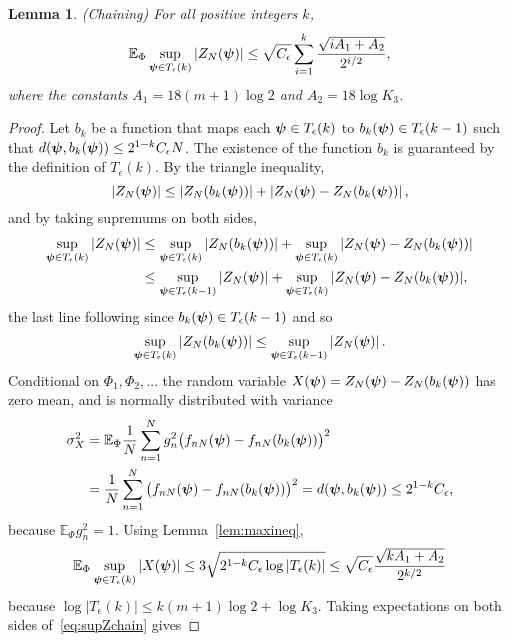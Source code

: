 \documentclass[aap,preprint]{imsart}
\newcommand{\expect}{{\mathbb E}}
\newcommand{\abs}[1]{\left\vert #1 \right\vert}
\newcommand{\sabs}[1]{\vert #1 \vert}
\newtheorem{lemma}{Lemma}
\begin{document}
\begin{lemma}\label{lem:chaining3}(Chaining)
For all positive integers $k$,
\[
\expect_{\Phi} \sup_{\psibf \in T_\epsilon(k) } \abs{ Z_N(\psibf) } \leq \sqrt{C_\epsilon} \sum_{i=1}^{k}\frac{\sqrt{ i A_1 + A_2 }}{2^{i/2}},
\]
where the constants $A_1 = 18(m+1)\log 2$ and $A_2 = 18\log K_3$.
\end{lemma}
\begin{proof}
Let $b_k$ be a function that maps each $\boldsymbol{\psi} \in T_\epsilon(k)$ to $b_k(\boldsymbol{\psi}) \in T_\epsilon(k-1)$ such that  $d(\boldsymbol{\psi},b_k(\boldsymbol{\psi})) \leq 2^{1-k} C_\epsilon N$.  The existence of the function $b_k$ is guaranteed by the definition of $T_\epsilon(k)$.  By the triangle inequality,
\[
\abs{ Z_N(\psibf) } \leq \abs{ Z_N(b_k(\psibf)) } + \abs{ Z_N(\psibf) - Z_N(b_k(\psibf))  },
\]
and by taking supremums on both sides,
\begin{align}
\sup_{\psibf \in T_\epsilon(k) } \sabs{ Z_N(\psibf) } &\leq \sup_{\psibf \in T_\epsilon(k) } \sabs{ Z_N(b_k(\psibf)) } + \sup_{\psibf \in T_\epsilon(k) } \sabs{ Z_N(\psibf) - Z_N(b_k(\psibf))  } \nonumber \\
&\leq \sup_{\psibf \in T_\epsilon(k-1)} \sabs{ Z_N(\psibf) } + \sup_{\psibf \in T_\epsilon(k)} \sabs{ Z_N(\psibf) - Z_N(b_k(\psibf)) }, \label{eq:supZchain}
\end{align}
the last line following since $b_k(\boldsymbol{\psi}) \in T_\epsilon(k-1)$ and so 
\[
\sup_{\psibf \in T_\epsilon(k)} \abs{ Z_N(b_k(\psibf)) } \leq \sup_{\psibf \in T_\epsilon(k-1)} \abs{ Z_N(\psibf) }.
\]
Conditional on $\Phi_1, \Phi_2, \dots$ the random variable $X(\boldsymbol{\psi}) = Z_N(\boldsymbol{\psi}) - Z_N(b_k(\boldsymbol{\psi}))$ has zero mean, and is normally distributed with variance
\begin{align*}
\sigma_X^2 &= \expect_{\Phi} \frac{1}{N} \sum_{n=1}^N g_n^2 \big( f_{nN}(\psibf) - f_{nN}(b_k(\psibf)) \big)^2 \\
&= \frac{1}{N} \sum_{n=1}^N \big( f_{nN}(\psibf) - f_{nN}(b_k(\psibf)) \big)^2 = d(\psibf, b_k(\psibf)) \leq 2^{1-k} C_\epsilon,
\end{align*}
because $\expect_{\Phi} g_n^2 = 1$.  Using Lemma~\ref{lem:maxineq}, 
\begin{align*}
\expect_{\Phi} \sup_{\psibf \in T_\epsilon(k)} \sabs{X(\psibf)} \leq 3\sqrt{2^{1-k} C_\epsilon \log\sabs{T_\epsilon(k)}} \leq \sqrt{C_\epsilon}\frac{\sqrt{  k A_1 + A_2 }}{2^{k/2}}
\end{align*}
because $\log\abs{T_\epsilon(k)} \leq k(m+1)\log 2 +  \log K_3$.  Taking expectations on both sides of~\eqref{eq:supZchain} gives

\end{proof}
\end{document}
